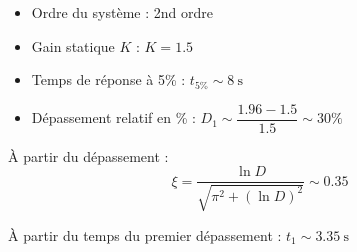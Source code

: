 \begin{center}
    
\end{center}
\begin{itemize}
    \item Ordre du système : 2nd ordre 
    \item Gain statique $K$ : $K=1.5$ 
    \item Temps de réponse à 5\% : $t_{5\%}\sim\SI{8}{\second}$ 
    \item Dépassement relatif en \% : $D_1\sim\dfrac{1.96-1.5}{1.5}\sim30\%$ 
\end{itemize}
\`A partir du dépassement : 
\[
\xi=\dfrac{\ln{D}}{\sqrt{\pi^2+(\ln{D})^2}}\sim0.35 
\]

\`A partir du temps du premier dépassement :
$t_1\sim\SI{3.35}{\second}$

